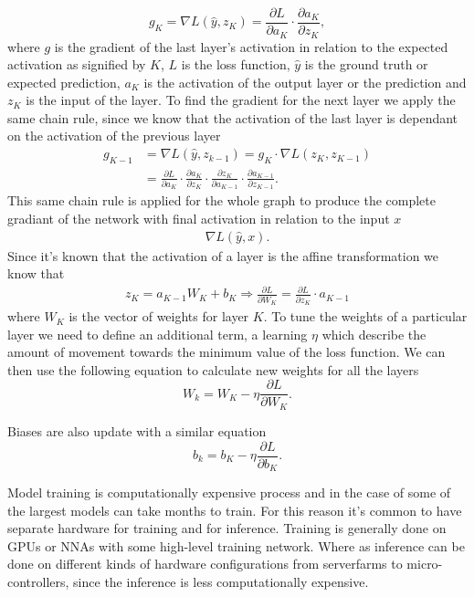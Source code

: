 \documentclass[12pt,a4paper,english
]{tunithesis}
\begin{document}
\begin{equation}
  g_{K} = \nabla L (\hat{y}, z_{K}) = \frac{\partial L}{\partial a_{K}} \cdot \frac{\partial a_{K}}{\partial z_{K}},
\end{equation}
where $g$ is the gradient of the last layer's activation in relation to the expected activation as signified by $K$, $L$ is the loss function, $\hat{y}$ is the ground truth or expected prediction, $a_{K}$ is the activation of the output layer or the prediction and $z_{K}$ is the input of the layer.
To find the gradient for the next layer we apply the same chain rule, since we know that the activation of the last layer is dependant on the activation of the previous layer
\begin{align}
  g_{K-1}& = \nabla L(\hat{y}, z_{k-1}) = g_{K} \cdot \nabla L(z_{K}, z_{K-1}) \\
  & = \frac{\partial L}{\partial a_{K}} \cdot \frac{\partial a_{K}}{\partial z_{K}} \cdot \frac{\partial z_{K}}{\partial a_{K-1}} \cdot \frac{\partial a_{K-1}}{\partial z_{K-1}}.
\end{align}
This same chain rule is applied for the whole graph to produce the complete gradiant of the network with final activation in relation to the input $x$
\begin{align}
  \nabla L(\hat{y}, x).
\end{align}
Since it's known that the activation of a layer is the affine transformation we know that
\begin{align}
  z_{K} = a_{K-1}W_{K} + b_{K} \Rightarrow \frac{\partial L}{\partial W_{K}} = \frac{\partial L}{\partial z_{K}} \cdot a_{K-1}
\end{align}
where $W_{K}$ is the vector of weights for layer $K$.
To tune the weights of a particular layer we need to define an additional term, a learning $\eta$ which describe the amount of movement towards the minimum value of the loss function. We can then use the following equation to calculate new weights for all the layers
\begin{equation}
  W_{k} = W_{K} - \eta \frac{\partial L}{\partial W_{K}}.
\end{equation}

Biases are also update with a similar equation
\begin{equation}
  b_{k} = b_{K} - \eta \frac{\partial L}{\partial b_{K}}.
\end{equation}


Model training is computationally expensive process and in the case of some of the largest models can take months to train. For this reason it's common to have separate hardware for training and for inference. Training is generally done on GPUs or NNAs with some high-level training network. Where as inference can be done on different kinds of hardware configurations from serverfarms to micro-controllers, since the inference is less computationally expensive.
\end{document}
